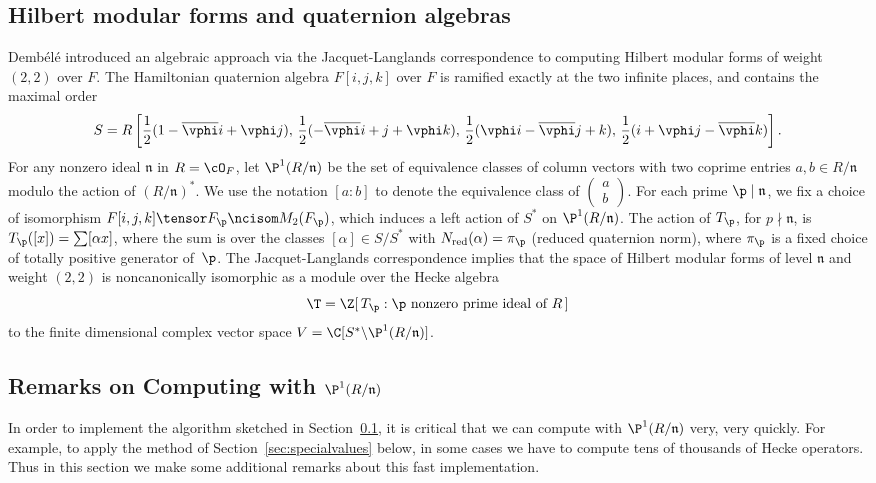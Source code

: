 \documentclass{amsart}
\newcommand{\n}{\mathfrak{n}}
\newcommand{\dembele}{Demb\'el{\'e}\xspace}
\begin{document}
\subsection{Hilbert modular forms and quaternion 
algebras}\label{sec:dembele}
\dembele \cite{dembele:hilbert5} introduced an algebraic approach via
the Jacquet-Langlands correspondence to computing Hilbert modular
forms of weight $(2,2)$ over $F$.  The Hamiltonian quaternion algebra
$F[i,j,k]$ over $F$ is ramified exactly at the two infinite places,
and contains the maximal order
$$
 S = R\left[\frac{1}{2}(1-\overline{\vphi} i + \vphi j),\,
       \frac{1}{2}(-\overline{\vphi} i + j + \vphi k),\,
       \frac{1}{2}(\vphi i - \overline{\vphi} j + k), \,
       \frac{1}{2}(i + \vphi j - \overline{\vphi} k)\right].
$$
For any nonzero ideal $\n$ in $R=\cO_F$,
let $\P^1(R/\n)$ be the set of equivalence classes of
 column vectors with two coprime entries $a,b \in R/\n$ modulo the
 action of $(R/\n)^*$.  We use the notation $[a:b]$
to denote the equivalence class of 
$\left(\begin{smallmatrix}a\\b\end{smallmatrix}\right)$.
For each prime $\p\mid \n$, we fix a choice of isomorphism
$F[i,j,k]\tensor F_{\p} \ncisom M_2(F_{\p})$, which induces a left
action of $S^*$ on $\P^1(R/\n)$. 
The action of $T_{\p}$, for $p\nmid \n$, is
$T_{\p}([x]) = \sum [\alpha x]$, where the sum is over the classes
$[\alpha]\in S/S^*$ with $N_{\text{red}}(\alpha)=\pi_{\p}$ (reduced quaternion norm),
where $\pi_{\p}$ is a fixed choice of totally positive generator of~$\p$.
The Jacquet-Langlands correspondence implies that
the space of Hilbert modular forms of level $\n$ and weight $(2,2)$ is
noncanonically isomorphic as a module over the Hecke algebra
$$\T=\Z[\,T_\p :  \p \text{ nonzero prime ideal of }R\,]$$ 
to the finite dimensional complex vector space 
$V= \C[S^* \backslash \P^1(R/\n)]$. 

\subsection{Remarks on Computing with $\P^1(R/\n)$}\label{sec:p1rn}

In order to implement the algorithm sketched in
Section~\ref{sec:dembele}, it is critical that we can compute with
$\P^1(R/\n)$ very, very quickly.  For example, to apply the method of
Section~\ref{sec:specialvalues} below, in some cases we have to
compute tens of thousands of Hecke operators.  Thus in this section we
make some additional remarks about this fast
implementation.
\end{document}
